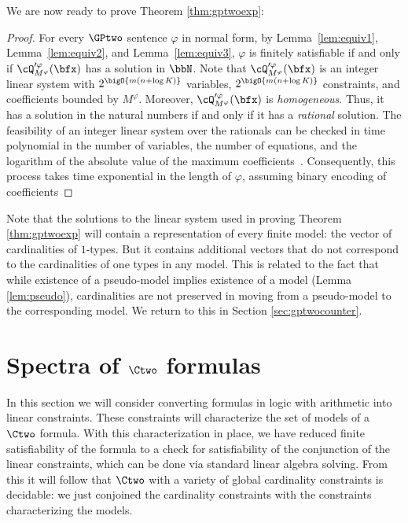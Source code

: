 We are now ready to prove Theorem \ref{thm:gptwoexp}:

\begin{proof}
    For every $\GPtwo$ sentence $\varphi$ in normal form,
    by Lemma~\ref{lem:equiv1}, Lemma~\ref{lem:equiv2}, and Lemma~\ref{lem:equiv3},
    $\varphi$ is finitely satisfiable if and only if $\cQ_{M^\varphi}'^\varphi(\bfx)$ has a solution in $\bbN$.
    Note that $\cQ_{M^\varphi}'^\varphi(\bfx)$ is an integer linear system with 
    $2^\bigO{m\left(n + \log K\right)}$ variables, 
    $2^\bigO{m\left(n + \log K\right)}$ constraints, and
    coefficients bounded by $M^\varphi$.
    Moreover, $\cQ_{M^\varphi}'^\varphi(\bfx)$ is \emph{homogeneous}. 
    Thus, it has a solution in the natural numbers if and only if it has a \emph{rational} solution.
    The feasibility of an integer linear system over the rationals can be checked in time polynomial in the number of variables, the number of equations, and the logarithm of the absolute value of the maximum coefficients~\cite{IP}. Consequently, this process takes time exponential in the length of $\varphi$, assuming binary encoding of coefficients
\end{proof}

Note that the solutions to the linear system used in proving Theorem \ref{thm:gptwoexp} will contain a representation of every finite model:  the vector of cardinalities of $1$-types. But it contains additional vectors that do not correspond to the cardinalities of one types in any model. This is related to the fact that while existence of a pseudo-model implies existence of a model (Lemma \ref{lem:pseudo}), cardinalities are not preserved in moving from a pseudo-model to the corresponding model.  We return to this in Section \ref{sec:gptwocounter}. 


\section{Spectra of $\Ctwo$ formulas} \label{sec:ctwo}



In this section we will consider converting formulas in logic with arithmetic into linear constraints. These constraints will characterize  the set of models of a $\Ctwo$ formula. With this characterization in place, we have reduced finite satisfiability of the formula to a check for satisfiability of the conjunction of the linear constraints, which can be done via standard linear algebra solving. From this it will follow that $\Ctwo$ with a variety of global cardinality constraints is decidable: we just conjoined the cardinality constraints with the constraints characterizing the models.

